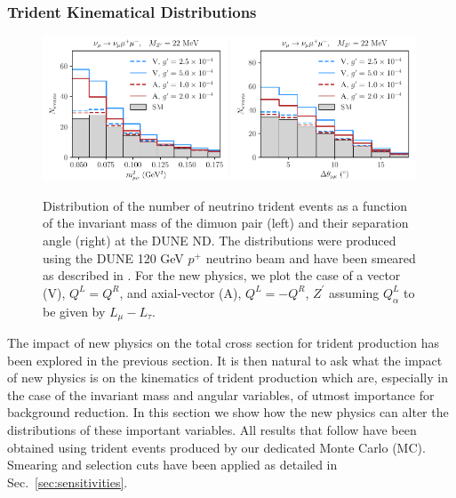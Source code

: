 \subsubsection{Trident Kinematical Distributions \label{sec:BSM_trident_kinematics}}
%
\begin{figure}[t]
%
\centering
%
\includegraphics[width=0.49\textwidth]{BSM_invmass_mumu.pdf}
\includegraphics[width=0.49\textwidth]{BSM_sepangle_mumu.pdf}
%
\caption[Kinematical distributions for dimuon tridents.]{Distribution of the number of neutrino trident events as a function of the invariant mass of the dimuon pair (left) and their separation angle (right) at the DUNE ND. The distributions were produced using the DUNE 120 GeV $p^+$ neutrino beam and have been smeared as described in . For the new physics, we plot the case of a vector (V), $Q^L = Q^R$, and axial-vector (A), $Q^L = -Q^R$,  $Z^\prime$ assuming $Q^L_{\alpha}$ to be given by $L_\mu - L_\tau$. \label{fig:mm_spectra}}
\end{figure}
%
The impact of new physics on the total cross section for trident production has been explored in the previous section. It is then natural to ask what the impact of new physics is on the kinematics of trident production which are, especially in the case of the invariant mass and angular variables, of utmost importance for background reduction. In this section we show how the new physics can alter the distributions of these important variables. All results that follow have been obtained using trident events produced by our dedicated Monte Carlo (MC). Smearing and selection cuts have been applied as detailed in Sec.~\ref{sec:sensitivities}.

